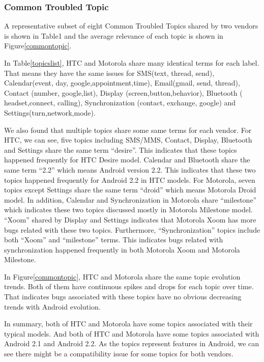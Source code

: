 \documentclass[10pt, conference, compsocconf]{IEEEtran}
\begin{document}
\subsubsection{Common Troubled Topic} 

A representative subset of eight Common Troubled Topics shared by two vendors is shown in Table1 and the average relevance of each topic is shown in Figure\ref{commontopic}. 

In Table\ref{topicslist}, HTC and Motorola share many identical terms for each label. That means they have the same issues for SMS(text, thread, send), Calendar(event, day, google,appointment,time), Email(gmail, send, thread), Contact (number, google,list), Display (screen,button,behavior), Bluetooth ( headset,connect, calling), Synchronization (contact, exchange, google) and Settings(turn,network,mode). 

We also found that multiple topics share some same terms for each vendor. For HTC, we can see, five topics including SMS/MMS, Contact, Display, Bluetooth and Settings share the same term “desire”. This indicates that these topics happened frequently for HTC Desire model. Calendar and Bluetooth share the same term “2.2” which means Android version 2.2. This indicates that these two topics happened frequently for Android 2.2 in HTC models. For Motorola, seven topics except Settings share the same term “droid” which means Motorola Droid model. In addition, Calendar and Synchronization in Motorola share “milestone” which indicates these two topics discussed mostly in Motorola Milestone model. “Xoom” shared by Display and Settings indicates that Motorola Xoom has more bugs related with these two topics. Furthermore, “Synchronization” topics include both “Xoom” and “milestone” terms. This indicates bugs related with synchronization happened frequently in both Motorola Xoom and Motorola Milestone. 

In Figure\ref{commontopic}, HTC and Motorola share the same topic evolution trends. Both of them have continuous spikes and drops for each topic over time. That indicates bugs associated with these topics have no obvious decreasing trends with Android evolution.

In summary, both of HTC and Motorola have some topics associated with their typical models. And both of HTC and Motorola have some topics associated with Android 2.1 and Android 2.2. As the topics represent features in Android, we can see there might be a compatibility issue for some topics for both vendors. 
\end{document}
